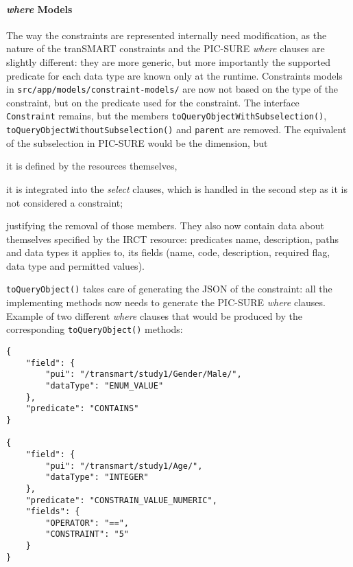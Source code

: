 \paragraph{\emph{where} Models}

The way the constraints are represented internally need modification, as the nature of the tranSMART constraints and the PIC-SURE \emph{where} clauses are slightly different: they are more generic, but more importantly the supported predicate for each data type are known only at the runtime.
Constraints models in \verb|src/app/models/constraint-models/| are now not based on the type of the constraint, but on the predicate used for the constraint.
The interface \verb|Constraint| remains, but the members \verb|toQueryObjectWithSubselection()|, \verb|toQueryObjectWithoutSubselection()| and \verb|parent| are removed.
The equivalent of the subselection in PIC-SURE would be the dimension, but 
\begin{enumerate*}[label=(\arabic*)]
  \item it is defined by the resources themselves,
  \item it is integrated into the \emph{select} clauses, which is handled in the second step as it is not considered a constraint;
\end{enumerate*}
justifying the removal of those members.
They also now contain data about themselves specified by the IRCT resource: predicates name, description, paths and data types it applies to, its fields (name, code, description, required flag, data type and permitted values).

\verb|toQueryObject()| takes care of generating the JSON of the constraint: all the implementing methods now needs to generate the PIC-SURE \emph{where} clauses.
Example of two different \emph{where} clauses that would be produced by the corresponding \verb|toQueryObject()| methods:
\begin{verbatim}
{
    "field": {
        "pui": "/transmart/study1/Gender/Male/",
        "dataType": "ENUM_VALUE"
    },
    "predicate": "CONTAINS"
}

{
    "field": {
        "pui": "/transmart/study1/Age/",
        "dataType": "INTEGER"
    },
    "predicate": "CONSTRAIN_VALUE_NUMERIC",
    "fields": {
        "OPERATOR": "==",
        "CONSTRAINT": "5"
    }
}
\end{verbatim}


